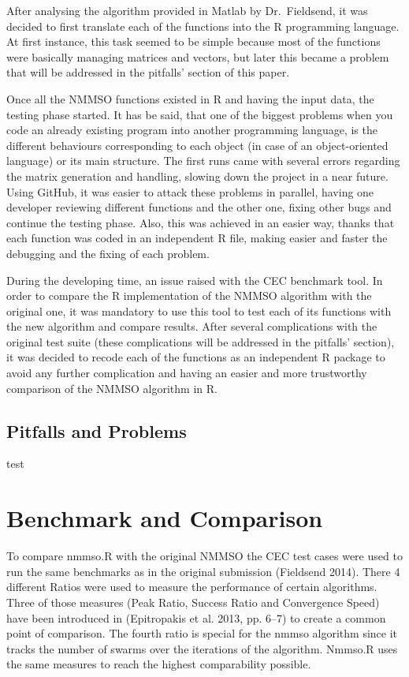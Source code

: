 \documentclass[12pt,a4paper]{article}
\begin{document}
After analysing the algorithm provided in Matlab by Dr.~Fieldsend, it
was decided to first translate each of the functions into the R
programming language. At first instance, this task seemed to be simple
because most of the functions were basically managing matrices and
vectors, but later this became a problem that will be addressed in the
pitfalls' section of this paper.

Once all the NMMSO functions existed in R and having the input data, the
testing phase started. It has be said, that one of the biggest problems
when you code an already existing program into another programming
language, is the different behaviours corresponding to each object (in
case of an object-oriented language) or its main structure. The first
runs came with several errors regarding the matrix generation and
handling, slowing down the project in a near future. Using GitHub, it
was easier to attack these problems in parallel, having one developer
reviewing different functions and the other one, fixing other bugs and
continue the testing phase. Also, this was achieved in an easier way,
thanks that each function was coded in an independent R file, making
easier and faster the debugging and the fixing of each problem.

During the developing time, an issue raised with the CEC benchmark tool.
In order to compare the R implementation of the NMMSO algorithm with the
original one, it was mandatory to use this tool to test each of its
functions with the new algorithm and compare results. After several
complications with the original test suite (these complications will be
addressed in the pitfalls' section), it was decided to recode each of
the functions as an independent R package to avoid any further
complication and having an easier and more trustworthy comparison of the
NMMSO algorithm in R.

\subsection{Pitfalls and Problems}\label{pitfalls-and-problems}

test

\section{Benchmark and Comparison}\label{benchmark-and-comparison}

To compare nmmso.R with the original NMMSO the CEC test cases were used
to run the same benchmarks as in the original submission (Fieldsend
2014). There 4 different Ratios were used to measure the performance of
certain algorithms. Three of those measures (Peak Ratio, Success Ratio
and Convergence Speed) have been introduced in (Epitropakis et al. 2013,
pp. 6--7) to create a common point of comparison. The fourth ratio is
special for the nmmso algorithm since it tracks the number of swarms
over the iterations of the algorithm. Nmmso.R uses the same measures to
reach the highest comparability possible.
\end{document}
